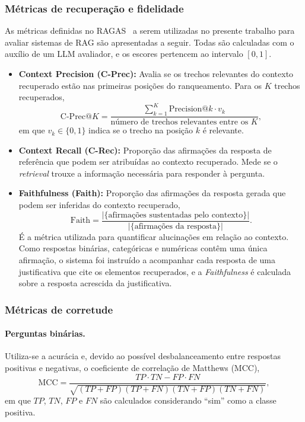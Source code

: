 \documentclass{article}
\begin{document}
\subsubsection{Métricas de recuperação e fidelidade}

As métricas definidas no RAGAS~\cite{es-etal-2024-ragas, ragas2024docs} a serem utilizadas no presente trabalho para avaliar sistemas de RAG são apresentadas a seguir. Todas são calculadas com o auxílio de um LLM avaliador, e os escores pertencem ao intervalo $[0, 1]$.

\begin{itemize}
	\item \textbf{Context Precision (C-Prec):} Avalia se os trechos relevantes do contexto recuperado estão nas primeiras posições do ranqueamento. Para os $K$ trechos recuperados,
	\begin{equation}
		\text{C-Prec@}K = \frac{\sum_{k=1}^{K} \text{Precision@}k \cdot v_k}{\text{número de trechos relevantes entre os } K},
	\end{equation}
	em que $v_k \in \{0, 1\}$ indica se o trecho na posição $k$ é relevante.

	\item \textbf{Context Recall (C-Rec):} Proporção das afirmações da resposta de referência que podem ser atribuídas ao contexto recuperado. Mede se o \textit{retrieval} trouxe a informação necessária para responder à pergunta.

	\item \textbf{Faithfulness (Faith):} Proporção das afirmações da resposta gerada que podem ser inferidas do contexto recuperado,
	\begin{equation}
		\text{Faith} = \frac{|\{\text{afirmações sustentadas pelo contexto}\}|}{|\{\text{afirmações da resposta}\}|}.
	\end{equation}
	É a métrica utilizada para quantificar alucinações em relação ao contexto. Como respostas binárias, categóricas e numéricas contêm uma única afirmação, o sistema foi instruído a acompanhar cada resposta de uma justificativa que cite os elementos recuperados, e a \textit{Faithfulness} é calculada sobre a resposta acrescida da justificativa.
\end{itemize}

\subsubsection{Métricas de corretude}

\paragraph{Perguntas binárias.} Utiliza-se a acurácia e, devido ao possível desbalanceamento entre respostas positivas e negativas, o coeficiente de correlação de Matthews (MCC),
\begin{equation}
	\text{MCC} = \frac{TP \cdot TN - FP \cdot FN}{\sqrt{(TP+FP)(TP+FN)(TN+FP)(TN+FN)}},
\end{equation}
em que $TP$, $TN$, $FP$ e $FN$ são calculados considerando ``sim'' como a classe positiva.
\end{document}
